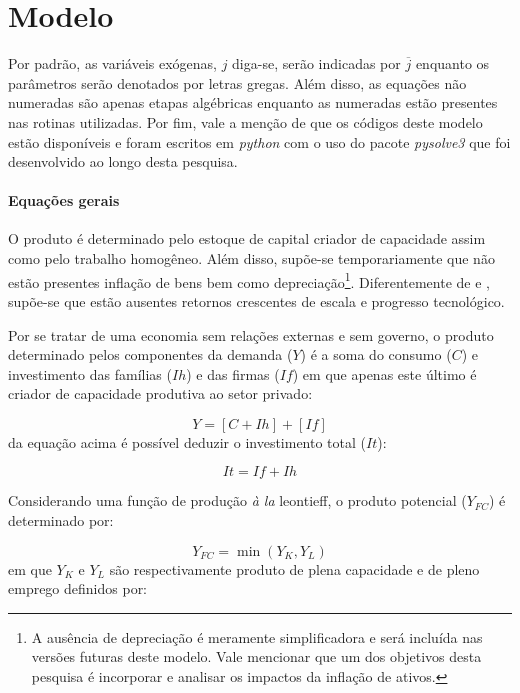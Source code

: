 \section{Modelo}
\label{SecModelo}

Por padrão, as variáveis exógenas, $j$ diga-se, serão indicadas por $\overline{j}$ enquanto os parâmetros serão denotados por letras gregas. Além disso, as equações não numeradas são apenas etapas algébricas enquanto as numeradas estão presentes nas rotinas utilizadas. Por fim, vale a menção de que os códigos deste modelo estão disponíveis e foram escritos em \textit{python} com o uso do pacote \textit{pysolve3} que foi desenvolvido ao longo desta pesquisa.

\paragraph*{Equações gerais}
O produto é determinado pelo estoque de capital criador de capacidade assim como pelo trabalho homogêneo. Além disso, supõe-se temporariamente que não estão presentes inflação de bens bem como depreciação\footnote{A ausência de depreciação é meramente simplificadora e será incluída nas versões futuras deste modelo. Vale mencionar que um dos objetivos desta pesquisa é incorporar e analisar os impactos da inflação de ativos.}.  Diferentemente de \textcite{nikiforos_utilization_2016} e \textcite{dutt_observations_2018}, supõe-se que estão ausentes retornos crescentes de escala e progresso tecnológico.

Por se tratar de uma economia sem relações externas e sem governo, o produto determinado pelos componentes da demanda ($Y$) é a soma do consumo ($C$) e investimento das famílias ($Ih$) e das firmas ($If$) em que apenas este último é criador de capacidade produtiva ao setor privado:

\begin{equation}
\label{_Y}
    Y = [C + Ih] + [If]
\end{equation}
da equação acima é possível deduzir o investimento total ($It$):

\begin{equation}
\label{_It}
    It = If + Ih
\end{equation}

Considerando uma função de produção \textit{à la} leontieff, o produto potencial ($Y_{FC}$) é determinado por:

$$
Y_{FC} = \min (Y_K, Y_L)
$$
em que $Y_K$ e $Y_L$ são respectivamente produto de plena capacidade e de pleno emprego definidos por:

